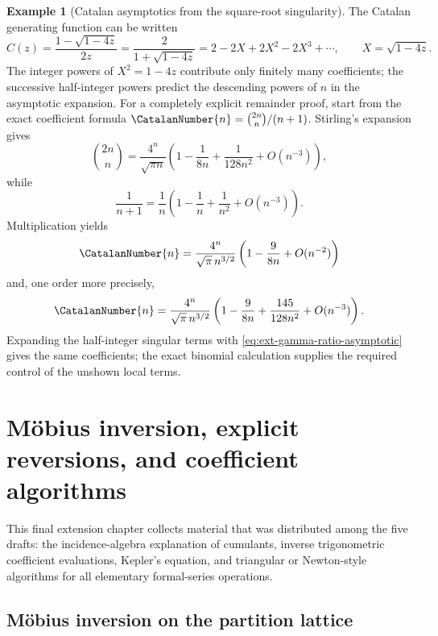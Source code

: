 \documentclass[11pt,a4paper,oneside,openany]{book}
\theoremstyle{definition}
\newtheorem{example}[theorem]{Example}
\theoremstyle{remark}
\begin{document}
\begin{example}[Catalan asymptotics from the square-root singularity]
The Catalan generating function can be written
\begin{equation}\label{eq:ext-catalan-local}
 C(z)=\frac{1-\sqrt{1-4z}}{2z}
 =\frac2{1+\sqrt{1-4z}}
 =2-2X+2X^2-2X^3+\cdots,
 \qquad X=\sqrt{1-4z}.
\end{equation}
The integer powers of \(X^2=1-4z\) contribute only finitely many coefficients;
the successive half-integer powers predict the descending powers of \(n\) in
the asymptotic expansion.  For a completely explicit remainder proof, start
from the exact coefficient formula
\(\CatalanNumber{n}=\binom{2n}{n}/(n+1)\).  Stirling's expansion gives
\[
 \binom{2n}{n}=\frac{4^n}{\sqrt{\pi n}}
 \left(1-\frac1{8n}+\frac1{128n^2}+O(n^{-3})\right),
\]
while
\[
 \frac1{n+1}=\frac1n\left(1-\frac1n+\frac1{n^2}+O(n^{-3})\right).
\]
Multiplication yields
\begin{equation}\label{eq:ext-catalan-asymptotic}
 \CatalanNumber{n}=\frac{4^n}{\sqrt\pi\,n^{3/2}}
 \left(1-\frac9{8n}+O(n^{-2})\right)
\end{equation}
and, one order more precisely,
\begin{equation}\label{eq:ext-catalan-asymptotic-two}
 \CatalanNumber{n}=\frac{4^n}{\sqrt\pi\,n^{3/2}}
 \left(1-\frac9{8n}+\frac{145}{128n^2}+O(n^{-3})\right).
\end{equation}
Expanding the half-integer singular terms with
\eqref{eq:ext-gamma-ratio-asymptotic} gives the same coefficients; the exact
binomial calculation supplies the required control of the unshown local
terms.
\end{example}

\chapter{M\"obius inversion, explicit reversions, and coefficient algorithms}
\label{ch:ext-inversion-algorithms}

This final extension chapter collects material that was distributed among the
five drafts: the incidence-algebra explanation of cumulants, inverse
trigonometric coefficient evaluations, Kepler's equation, and triangular or
Newton-style algorithms for all elementary formal-series operations.

\section{M\"obius inversion on the partition lattice}
\end{document}
